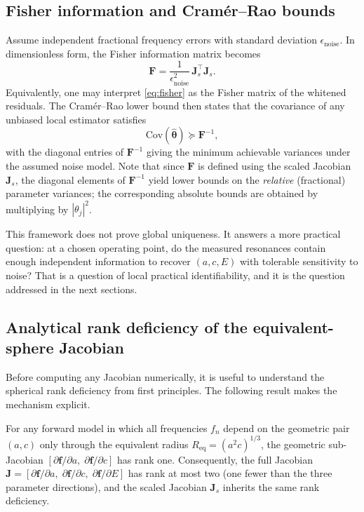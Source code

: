 \subsection{Fisher information and Cram\'er--Rao bounds}

Assume independent fractional frequency errors with standard deviation
$\epsilon_\mathrm{noise}$.  In dimensionless form, the Fisher information
matrix becomes
\begin{equation}\label{eq:fisher}
  \mathbf{F}
  =
  \frac{1}{\epsilon_\mathrm{noise}^2}\,
  \mathbf{J}_s^\top \mathbf{J}_s.
\end{equation}
Equivalently, one may interpret \eqref{eq:fisher} as the Fisher matrix of the
whitened residuals.  The Cram\'er--Rao lower bound then states that the
covariance of any unbiased local estimator satisfies
\begin{equation}\label{eq:crlb}
  \mathrm{Cov}(\hat{\boldsymbol{\theta}})
  \succeq
  \mathbf{F}^{-1},
\end{equation}
with the diagonal entries of $\mathbf{F}^{-1}$ giving the minimum achievable
variances under the assumed noise model.  Note that since $\mathbf{F}$ is
defined using the scaled Jacobian $\mathbf{J}_s$, the diagonal elements of
$\mathbf{F}^{-1}$ yield lower bounds on the \emph{relative} (fractional)
parameter variances; the corresponding absolute bounds are obtained by
multiplying by $|\theta_j|^2$.

This framework does not prove global uniqueness.  It answers a more practical
question: at a chosen operating point, do the measured resonances contain enough
independent information to recover $(a,c,E)$ with tolerable sensitivity to
noise?  That is a question of local practical identifiability, and it is the
question addressed in the next sections.

\subsection{Analytical rank deficiency of the equivalent-sphere Jacobian}

Before computing any Jacobian numerically, it is useful to understand the
spherical rank deficiency from first principles.  The following result makes the
mechanism explicit.

\begin{proposition}\label{prop:chain_rule}
For any forward model in which all frequencies $f_n$ depend on the geometric
pair $(a,c)$ only through the equivalent radius
$R_\mathrm{eq} = (a^2 c)^{1/3}$, the geometric sub-Jacobian
$[\partial \mathbf{f}/\partial a,\;\partial \mathbf{f}/\partial c]$ has rank
one.  Consequently, the full Jacobian
$\mathbf{J} = [\partial \mathbf{f}/\partial a,\;
\partial \mathbf{f}/\partial c,\;
\partial \mathbf{f}/\partial E]$
has rank at most two (one fewer than the three parameter directions), and
the scaled Jacobian $\mathbf{J}_s$ inherits the same rank deficiency.
\end{proposition}

